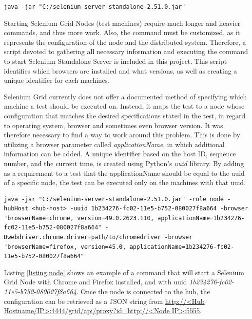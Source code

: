 \vspace{4mm}
\begin{lstlisting}[caption=Sample Shell Command for Starting Selenium Grid Hub, label={listing.hub}]
java -jar "C:/selenium-server-standalone-2.51.0.jar"
\end{lstlisting}

Starting Selenium Grid Nodes (test machines) require much longer and heavier commands, and thus more work. Also, the command must be customized, as it represents the configuration of the node and the distributed system. Therefore, a script devoted to gathering all necessary information and executing the command to start Selenium Standalone Server is included in this project. This script identifies which browsers are installed and what versions, as well as creating a unique identifier for each machines.

Selenium Grid currently does not offer a documented method of specifying which machine a test should be executed on. Instead, it maps the test to a node whose configuration that matches the desired specifications stated in the test, in regard to operating system, browser and sometimes even browser version. It was therefore necessary to find a way to work around this problem. This is done by utilizing a browser parameter called \emph{applicationName}, in which additional information can be added. A unique identifier based on the host ID, sequence number, and the current time, is created using Python's \emph{uuid} library. By adding as a requirement to a test that the applicationName should be equal to the uuid of a specific node, the test can be executed only on the machines with that uuid.

\vspace{4mm}
\begin{lstlisting}[caption=Sample Shell Command for Starting Selenium Grid Node, label={listing.node}]
java -jar "C:/selenium-server-standalone-2.51.0.jar" -role node -hubHost <hub-host> -uuid 1b234276-fc02-11e5-b752-080027f8a664 -browser "browserName=chrome, version=49.0.2623.110, applicationName=1b234276-fc02-11e5-b752-080027f8a664" -Dwebdriver.chrome.driver=path/to/chromedriver -browser "browserName=firefox, version=45.0, applicationName=1b234276-fc02-11e5-b752-080027f8a664"
\end{lstlisting}

Listing \ref{listing.node} shows an example of a command that will start a Selenium Grid Node with Chrome and Firefox installed, and with uuid \emph{1b234276-fc02-11e5-b752-080027f8a664}. Once the node is connected to the hub, the configuration can be retrieved as a JSON string from \url{http://<Hub Hostname/IP>:4444/grid/api/proxy?id=http://<Node IP>:5555}.

